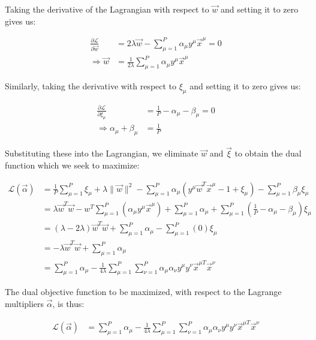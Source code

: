 \documentclass[11pt]{book} %
\begin{document}
Taking the derivative of the Lagrangian with respect to $\vec{w}$ and setting it to zero gives us:

\begin{align*}
    \frac{\partial \mathcal{L}}{\partial \vec{w}} &= 2 \lambda \vec{w} - \sum_{\mu=1}^P \alpha_{\mu} y^{\mu} \vec{x}^{\mu} = 0 \\
    \Rightarrow \vec{w} &= \frac{1}{2\lambda} \sum_{\mu=1}^P \alpha_{\mu} y^{\mu} \vec{x}^{\mu}
\end{align*}

Similarly, taking the derivative with respect to $\xi_{\mu}$ and setting it to zero gives us:

\begin{align*}
    \frac{\partial \mathcal{L}}{\partial \xi_{\mu}} &= \frac{1}{P} - \alpha_{\mu} - \beta_{\mu} = 0 \\
    \Rightarrow \alpha_{\mu} + \beta_{\mu} &= \frac{1}{P}
\end{align*}

Substituting these into the Lagrangian, we eliminate $\vec{w}$ and $\vec{\xi}$ to obtain the dual function which we seek to maximize:

\begin{align*}
    \mathcal{L}(\vec{\alpha}) &= \frac{1}{P} \sum_{\mu=1}^P \xi_{\mu} + \lambda \lVert \vec{w} \rVert^2 - \sum_{\mu=1}^P \alpha_{\mu} (y^{\mu} \vec{w}^T \vec{x}^{\mu} - 1 + \xi_{\mu}) - \sum_{\mu=1}^P \beta_{\mu} \xi_{\mu} \\
    &= \lambda \vec{w}^T \vec{w} - w^T \sum_{\mu=1}^P \left( \alpha_{\mu} y^{\mu} \vec{x}^{\mu} \right) + \sum_{\mu=1}^P \alpha_{\mu} + \sum_{\mu=1}^P \left( \frac{1}{P}  - \alpha_\mu - \beta_{\mu} \right) \xi_{\mu} \\
    &= (\lambda - 2\lambda ) \vec{w}^T \vec{w} + \sum_{\mu=1}^P \alpha_{\mu} - \sum_{\mu=1}^P \left( 0 \right) \xi_{\mu} \\
    &= -\lambda \vec{w}^T \vec{w} + \sum_{\mu=1}^P \alpha_{\mu} \\
    &= \sum_{\mu=1}^P \alpha_{\mu} - \frac{1}{4\lambda} \sum_{\mu=1}^P \sum_{\nu=1}^P \alpha_{\mu} \alpha_{\nu} y^{\mu} y^{\nu} \vec{x}^{\mu T} \vec{x}^{\nu}
\end{align*}


The dual objective function to be maximized, with respect to the Lagrange multipliers $\vec{\alpha}$, is thus:

\begin{align*}
    \mathcal{L}(\vec{\alpha}) &= \sum_{\mu=1}^P \alpha_{\mu} - \frac{1}{4\lambda} \sum_{\mu=1}^P \sum_{\nu=1}^P \alpha_{\mu} \alpha_{\nu} y^{\mu} y^{\nu} \vec{x}^{\mu T} \vec{x}^{\nu} 
\end{align*}
\end{document}
